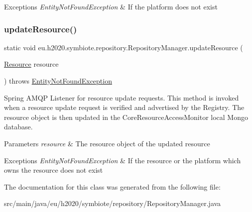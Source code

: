 \begin{DoxyExceptions}{Exceptions}
{\em Entity\+Not\+Found\+Exception} & If the platform does not exist \\
\hline
\end{DoxyExceptions}
\mbox{\label{classeu_1_1h2020_1_1symbiote_1_1repository_1_1RepositoryManager_a49626e0b688780c44cac19cf9e3f1a51}} 
\subsubsection{\texorpdfstring{update\+Resource()}{updateResource()}}
{\footnotesize\ttfamily static void eu.\+h2020.\+symbiote.\+repository.\+Repository\+Manager.\+update\+Resource (\begin{DoxyParamCaption}\item[{\hyperlink{classeu_1_1h2020_1_1symbiote_1_1model_1_1Resource}{Resource}}]{resource }\end{DoxyParamCaption}) throws \hyperlink{classeu_1_1h2020_1_1symbiote_1_1exception_1_1EntityNotFoundException}{Entity\+Not\+Found\+Exception}\hspace{0.3cm}{\ttfamily [static]}}

Spring A\+M\+QP Listener for resource update requests. This method is invoked when a resource update request is verified and advertised by the Registry. The resource object is then updated in the Core\+Resource\+Access\+Monitor local Mongo database.


\begin{DoxyParams}{Parameters}
{\em resource} & The resource object of the updated resource \\
\hline
\end{DoxyParams}

\begin{DoxyExceptions}{Exceptions}
{\em Entity\+Not\+Found\+Exception} & If the resource or the platform which owns the resource does not exist \\
\hline
\end{DoxyExceptions}


The documentation for this class was generated from the following file\+:\begin{DoxyCompactItemize}
\item 
src/main/java/eu/h2020/symbiote/repository/Repository\+Manager.\+java\end{DoxyCompactItemize}
